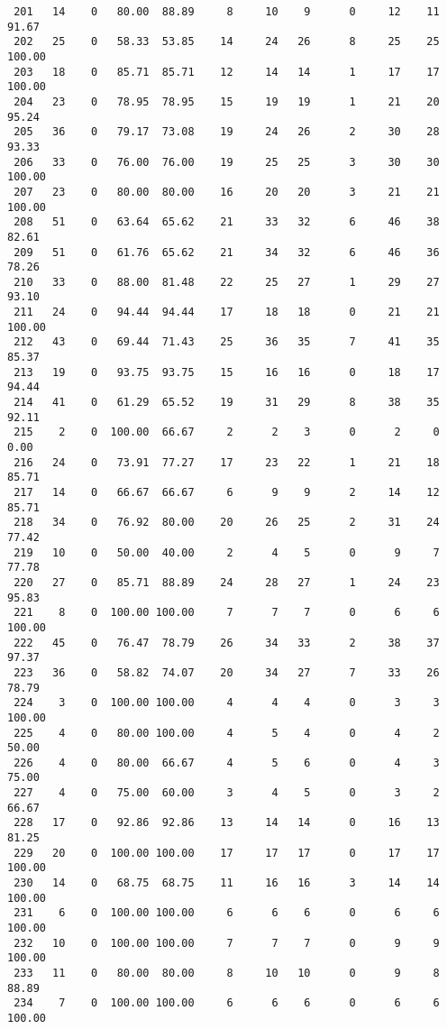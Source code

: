 \begin{verbatim}
 201   14    0   80.00  88.89     8     10    9      0     12    11    91.67
 202   25    0   58.33  53.85    14     24   26      8     25    25   100.00
 203   18    0   85.71  85.71    12     14   14      1     17    17   100.00
 204   23    0   78.95  78.95    15     19   19      1     21    20    95.24
 205   36    0   79.17  73.08    19     24   26      2     30    28    93.33
 206   33    0   76.00  76.00    19     25   25      3     30    30   100.00
 207   23    0   80.00  80.00    16     20   20      3     21    21   100.00
 208   51    0   63.64  65.62    21     33   32      6     46    38    82.61
 209   51    0   61.76  65.62    21     34   32      6     46    36    78.26
 210   33    0   88.00  81.48    22     25   27      1     29    27    93.10
 211   24    0   94.44  94.44    17     18   18      0     21    21   100.00
 212   43    0   69.44  71.43    25     36   35      7     41    35    85.37
 213   19    0   93.75  93.75    15     16   16      0     18    17    94.44
 214   41    0   61.29  65.52    19     31   29      8     38    35    92.11
 215    2    0  100.00  66.67     2      2    3      0      2     0     0.00
 216   24    0   73.91  77.27    17     23   22      1     21    18    85.71
 217   14    0   66.67  66.67     6      9    9      2     14    12    85.71
 218   34    0   76.92  80.00    20     26   25      2     31    24    77.42
 219   10    0   50.00  40.00     2      4    5      0      9     7    77.78
 220   27    0   85.71  88.89    24     28   27      1     24    23    95.83
 221    8    0  100.00 100.00     7      7    7      0      6     6   100.00
 222   45    0   76.47  78.79    26     34   33      2     38    37    97.37
 223   36    0   58.82  74.07    20     34   27      7     33    26    78.79
 224    3    0  100.00 100.00     4      4    4      0      3     3   100.00
 225    4    0   80.00 100.00     4      5    4      0      4     2    50.00
 226    4    0   80.00  66.67     4      5    6      0      4     3    75.00
 227    4    0   75.00  60.00     3      4    5      0      3     2    66.67
 228   17    0   92.86  92.86    13     14   14      0     16    13    81.25
 229   20    0  100.00 100.00    17     17   17      0     17    17   100.00
 230   14    0   68.75  68.75    11     16   16      3     14    14   100.00
 231    6    0  100.00 100.00     6      6    6      0      6     6   100.00
 232   10    0  100.00 100.00     7      7    7      0      9     9   100.00
 233   11    0   80.00  80.00     8     10   10      0      9     8    88.89
 234    7    0  100.00 100.00     6      6    6      0      6     6   100.00

\end{verbatim}
